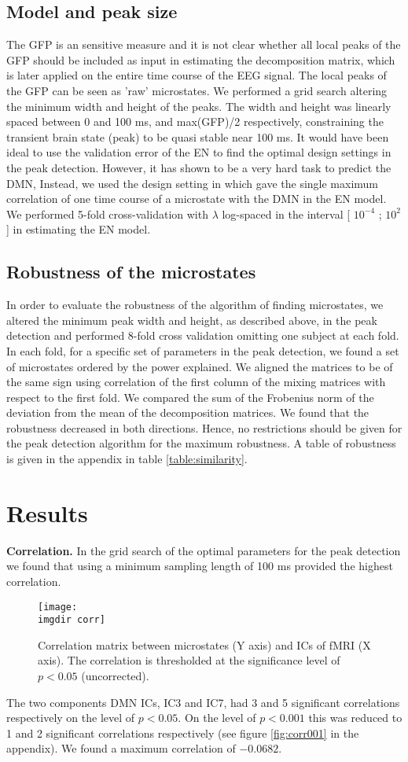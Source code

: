 \documentclass{article}
\newcommand{\imgdir}{Images/} %
\begin{document}
\subsection{Model and peak size}
The GFP is an sensitive measure and it is not clear whether all local peaks of the GFP should be included as input in estimating the decomposition matrix, which is later applied on the entire time course of the EEG signal. The local peaks of the GFP can be seen as 'raw' microstates. We performed a grid search altering the minimum width and height of the peaks. The width and height was linearly spaced between 0 and 100 ms, and max(GFP)/2 respectively, constraining the transient brain state (peak) to be quasi stable near 100 ms.
It would have been ideal to use the validation error of the EN to find the optimal design settings in the peak detection. However, it has shown to be a very hard task to predict the DMN, Instead, we used the design setting in which gave the single maximum correlation of one time course of a microstate with the DMN in the EN model.
We performed 5-fold cross-validation with $\lambda$ log-spaced in the interval 
[ $10^{-4}$ ; $10^2$] in estimating the EN model.
\subsection{Robustness of the microstates}
In order to evaluate the robustness of the algorithm of finding microstates, we altered the minimum peak width and height, as described above, in the peak detection and performed 8-fold cross validation omitting one subject at each fold. In each fold, for a specific set of parameters in the peak detection, we found a set of microstates ordered by the power explained. We aligned the matrices to be of the same sign using correlation of the first column of the mixing matrices with respect to the first fold. We compared the sum of the Frobenius norm of the deviation from the mean of the decomposition matrices. We found that the robustness decreased in both directions. Hence, no restrictions should be given for the peak detection algorithm for the maximum robustness. A table of robustness is given in the appendix in table \ref{table:similarity}.
\section{Results}

\textbf{Correlation.} In the grid search of the optimal parameters for the peak detection we found that using a minimum sampling length of 100 ms provided the highest correlation.
\begin{figure}[!ht]
    \centering
    \texttt{[image: \\imgdir corr]}
    \caption{Correlation matrix between microstates (Y axis) and ICs of fMRI (X axis). The correlation is thresholded at the significance level of $p<0.05$ (uncorrected).}
    \label{fig:grid}
\end{figure}
The two components DMN ICs, IC3 and IC7, had 3 and 5 significant correlations respectively on the level of $p<0.05$. On the level of $p<0.001$ this was reduced to 1 and 2 significant correlations respectively (see figure \ref{fig:corr001} in the appendix). We found a maximum correlation of $-0.0682$.
\end{document}

